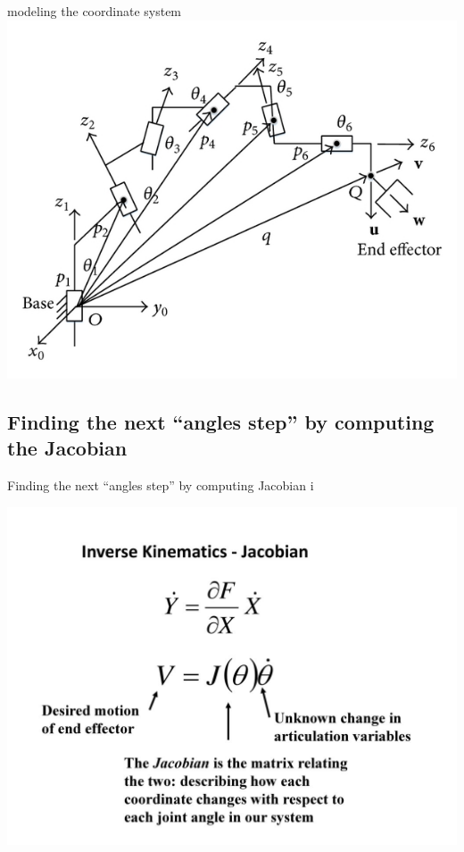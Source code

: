 \documentclass{beamer}
\begin{document}
\begin{frame}[allowframebreaks]{modeling the coordinate system}
	\center
	\includegraphics[scale = 1.8]{A-6R-manipulator-with-normal-configuration.png}\cite{4}

\end{frame}

\subsection{Finding the next ``angles step'' by computing the Jacobian}
\begin{frame}{Finding the next ``angles step'' by computing Jacobian i}


	\includegraphics[scale = 1.2]{slide_30.jpg}\cite{5}
\end{frame}
\end{document}
